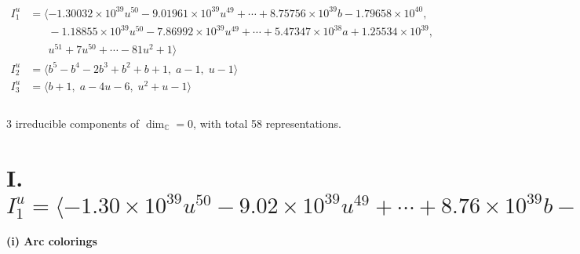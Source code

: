 \documentclass[1p]{elsarticle_modified}
\theoremstyle{definition}
\begin{document}
\begin{align*}
I^u_{1}&=\langle 
-1.30032\times10^{39} u^{50}-9.01961\times10^{39} u^{49}+\cdots+8.75756\times10^{39} b-1.79658\times10^{40},\\
\phantom{I^u_{1}}&\phantom{= \langle  }-1.18855\times10^{39} u^{50}-7.86992\times10^{39} u^{49}+\cdots+5.47347\times10^{38} a+1.25534\times10^{39},\\
\phantom{I^u_{1}}&\phantom{= \langle  }u^{51}+7 u^{50}+\cdots-81 u^2+1\rangle \\
I^u_{2}&=\langle 
b^5- b^4-2 b^3+b^2+b+1,\;a-1,\;u-1\rangle \\
I^u_{3}&=\langle 
b+1,\;a-4 u-6,\;u^2+u-1\rangle \\
\\
\end{align*}
\raggedright * 3 irreducible components of $\dim_{\mathbb{C}}=0$, with total 58 representations.\\
\newpage
\renewcommand{\arraystretch}{1}
\centering \section*{I. $I^u_{1}= \langle -1.30\times10^{39} u^{50}-9.02\times10^{39} u^{49}+\cdots+8.76\times10^{39} b-1.80\times10^{40},\;-1.19\times10^{39} u^{50}-7.87\times10^{39} u^{49}+\cdots+5.47\times10^{38} a+1.26\times10^{39},\;u^{51}+7 u^{50}+\cdots-81 u^2+1 \rangle$}
\flushleft \textbf{(i) Arc colorings}\\
\end{document}
